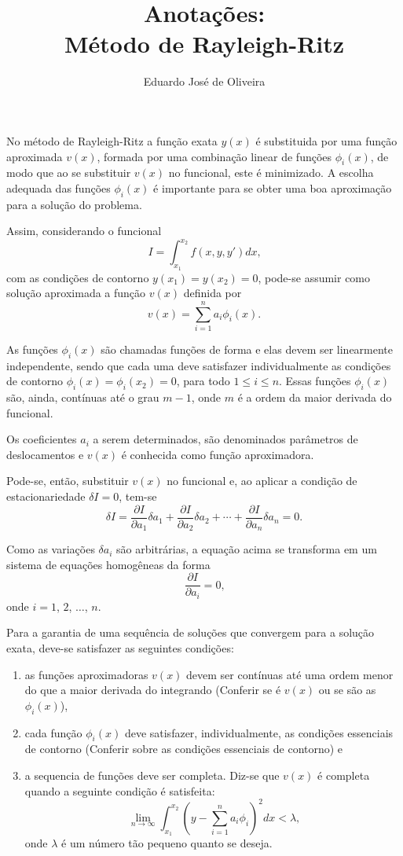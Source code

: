 \documentclass[12pt,a4paper]{article}
\author{Eduardo José de Oliveira}
\title{Anotações:\\Método de Rayleigh-Ritz}
\newcommand{\todo}[1]{{\color{red}#1}}
\begin{document}
\maketitle

No método de Rayleigh-Ritz a função exata $y(x)$ é substituida por uma função aproximada $v(x)$, formada por uma combinação linear de funções $\phi _i(x)$, de modo que ao se substituir $v(x)$ no funcional, este é minimizado.  A escolha adequada das funções $\phi _i(x)$ é importante para se obter uma boa aproximação para a solução do problema.

Assim, considerando o funcional
$$
I=
\int_{x_1}^{x_2}
	f(x, y, y')
dx
\text{,}
$$
com as condições de contorno $y(x_1)=y(x_2)=0$, pode-se assumir como solução aproximada a função $v(x)$ definida por
$$
v(x)=
\sum_{i=1}^n
	a_i \phi _i (x)
\text{.}
$$

As funções $\phi _i(x)$ são chamadas funções de forma e elas devem ser linearmente independente, sendo que cada uma deve satisfazer individualmente as condições de contorno $\phi_i (x)=\phi_i (x_2)= 0$, para todo $1\leqslant i\leqslant n$. Essas funções $\phi _i(x)$ são, ainda, contínuas até o grau $m-1$, onde $m$ é a ordem da maior derivada do funcional.

Os coeficientes $a_i$ a serem determinados, são denominados parâmetros de deslocamentos e $v(x)$ é conhecida como função aproximadora.

Pode-se, então, substituir $v(x)$ no funcional e, ao aplicar a condição de estacionariedade $\delta I = 0$, tem-se
$$
\delta I = 
	\frac{\partial I}{\partial a_1}\delta a_1 +
	\frac{\partial I}{\partial a_2}\delta a_2 +
	\cdots +
	\frac{\partial I}{\partial a_n}\delta a_n
= 0
\text{.}
$$

Como as variações $\delta a_i$ são arbitrárias, a equação acima se transforma em um sistema de equações homogêneas da forma
$$
\frac{\partial I}{\partial a_i}=0
\text{,}
$$
onde $i=1$, $2$, $\dots$, $n$. 

Para a garantia de uma sequência de soluções que convergem para a solução exata, deve-se satisfazer as seguintes condições:

\begin{enumerate}
	\item as funções aproximadoras $v(x)$ devem ser contínuas até uma ordem menor do que a maior derivada do integrando (\todo{Conferir se é $v(x)$ ou se são as $\phi_i(x)$}), 
	
	\item cada função $\phi _i(x)$ deve satisfazer, individualmente, as condições essenciais de contorno (\todo{Conferir sobre as condições essenciais de contorno}) e
	
	\item a sequencia de funções deve ser completa. Diz-se que $v(x)$ é completa quando a seguinte condição é satisfeita:
	$$\lim_{n\to \infty} \int_{x_1}^{x_2} \left ( y - \sum_{i=1}^n a_i \phi_i \right )^2 dx < \lambda \text{,}$$
	onde $\lambda$ é um número tão pequeno quanto se deseja.
\end{enumerate}
\end{document}
